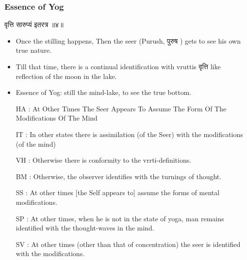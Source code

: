 \begin{frame}[fragile]\frametitle{Essence of Yog}

\begin{sanskrit}
वृत्ति सारुप्यं इतरत्र ॥४॥
\end{sanskrit}


	\begin{itemize}
	\item Once the stilling happens, Then the seer (Purush, पुरुष ) gets to see his own true nature.
	\item Till that time, there is a continual identification with vruttis वृत्ति like reflection of the moon in the lake.
	\item Essence of Yog: still the mind-lake, to see the true bottom.
	\item [HA]: At Other Times The Seer Appears To Assume The Form Of The Modifications Of The Mind
	\item [IT]: In other states there is assimilation (of the Seer) with the modifications (of the mind)
	\item [VH]: Otherwise there is conformity to the vrrti-definitions.
	\item [BM]: Otherwise, the observer identifies with the turnings of thought.
	\item [SS]: At other times [the Self appears to] assume the forms of mental modifications.
	\item [SP]: At other times, when he is not in the state of yoga, man remains identified with the thought-waves in the mind.
	\item [SV]: At other times (other than that of concentration) the seer is identified with the modifications.	
	\end{itemize}

\end{frame}


